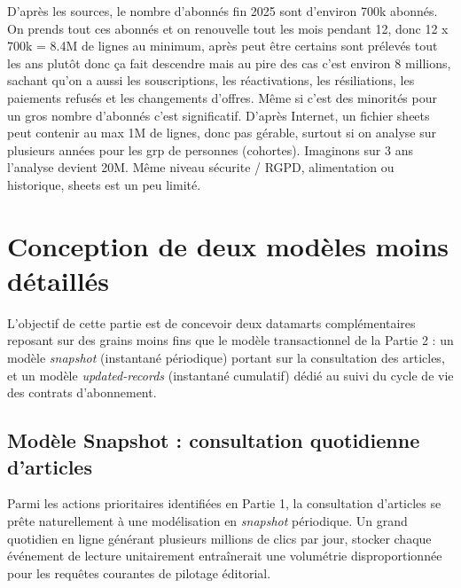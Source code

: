 \documentclass[a4paper,12pt]{article}
\begin{document}
D’après les sources, le nombre d’abonnés fin 2025 sont d’environ 700k abonnés. On prends tout ces abonnés et on renouvelle tout les mois pendant 12, donc 12 x 700k = 8.4M de lignes au minimum, après peut être certains sont prélevés tout les ans plutôt donc ça fait descendre mais au pire des cas c’est environ 8 millions, sachant qu’on a aussi les souscriptions, les réactivations, les résiliations, les paiements refusés et les changements d’offres. Même si c’est des minorités pour un gros nombre d’abonnés c’est significatif. D’après Internet, un fichier sheets peut contenir au max 1M de lignes, donc pas gérable, surtout si on analyse sur plusieurs années pour les grp de personnes (cohortes). Imaginons sur 3 ans l’analyse devient 20M. Même niveau sécurite / RGPD, alimentation ou historique, sheets est un peu limité.

\section{Conception de deux modèles moins détaillés}

L'objectif de cette partie est de concevoir deux datamarts complémentaires reposant sur des grains moins fins que le modèle transactionnel de la Partie 2 : un modèle \emph{snapshot} (instantané périodique) portant sur la consultation des articles, et un modèle \emph{updated-records} (instantané cumulatif) dédié au suivi du cycle de vie des contrats d'abonnement.


\subsection{Modèle Snapshot : consultation quotidienne d'articles}

Parmi les actions prioritaires identifiées en Partie 1, la consultation d'articles se prête naturellement à une modélisation en \emph{snapshot} périodique. Un grand quotidien en ligne générant plusieurs millions de clics par jour, stocker chaque événement de lecture unitairement entraînerait une volumétrie disproportionnée pour les requêtes courantes de pilotage éditorial.
\end{document}
